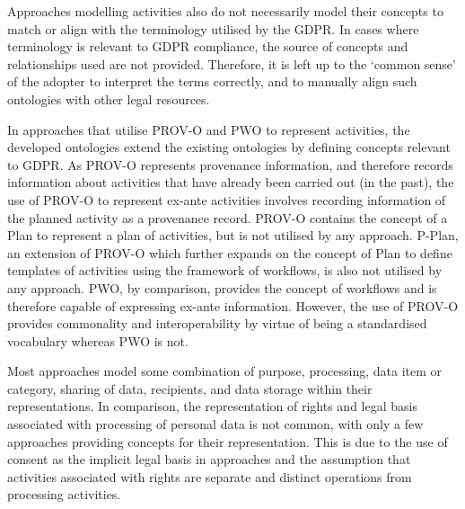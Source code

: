 Approaches modelling activities also do not necessarily model their concepts to match or align with the terminology utilised by the GDPR. In cases where terminology is relevant to GDPR compliance, the source of concepts and relationships used are not provided. Therefore, it is left up to the `common sense' of the adopter to interpret the terms correctly, and to  manually align such ontologies with other legal resources.

In approaches that utilise PROV-O and PWO to represent activities, the developed ontologies extend the existing ontologies by defining concepts relevant to GDPR. As PROV-O represents provenance information, and therefore records information about activities that have already been carried out (in the past), the use of PROV-O to represent ex-ante activities involves recording information of the planned activity as a provenance record. PROV-O contains the concept of a Plan to represent a plan of activities, but is not utilised by any approach. P-Plan, an extension of PROV-O which further expands on the concept of Plan to define templates of activities using the framework of workflows, is also not utilised by any approach. PWO, by comparison, provides the concept of workflows and is therefore capable of expressing ex-ante information. However, the use of PROV-O provides commonality and interoperability by virtue of being a standardised vocabulary whereas PWO is not.

Most approaches model some combination of purpose, processing, data item or category, sharing of data, recipients, and data storage within their representations. In comparison, the representation of rights and legal basis associated with processing of personal data is not common, with only a few approaches providing concepts for their representation. This is due to the use of consent as the implicit legal basis in approaches and the assumption that activities associated with rights are separate and distinct operations from processing activities. 


